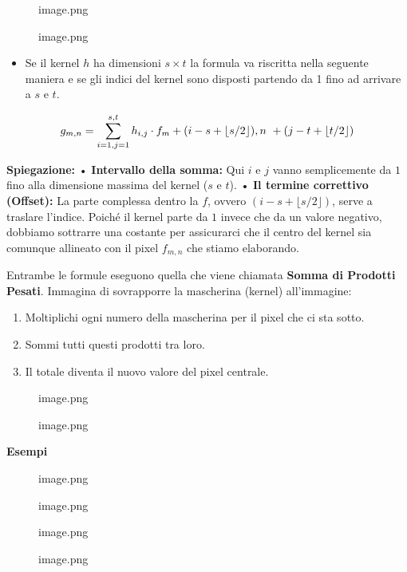 \documentclass[
]{article}
\providecommand{\tightlist}{%
  \setlength{\itemsep}{0pt}\setlength{\parskip}{0pt}}
\begin{document}
\begin{figure}
\centering
{image.png}
\caption{image.png}
\end{figure}

\begin{itemize}
\tightlist
\item
  Se il kernel \(h\) ha dimensioni \(s \times t\) la formula va riscritta nella seguente maniera e se gli indici del kernel sono disposti partendo da 1 fino ad arrivare a \(s\) e \(t\).
\end{itemize}

\[
g_{m,n} = \sum_{i=1, \space j=1}^{s, t}\space h_{i,j} \space \cdot \space f_m+(i-s+\left\lfloor s/2 \right\rfloor), n  + (j-t + \left\lfloor t/2 \right\rfloor)
\]

\textbf{Spiegazione:}
• \textbf{Intervallo della somma:} Qui \(i\) e \(j\) vanno semplicemente da \(1\) fino alla dimensione massima del kernel (\(s\) e \(t\)).
• \textbf{Il termine correttivo (Offset):} La parte complessa dentro la \(f\), ovvero \((i - s + \lfloor s/2 \rfloor)\), serve a traslare l'indice. Poiché il kernel parte da \(1\) invece che da un valore negativo, dobbiamo sottrarre una costante per assicurarci che il centro del kernel sia comunque allineato con il pixel \(f_{m,n}\) che stiamo elaborando.

Entrambe le formule eseguono quella che viene chiamata \textbf{Somma di Prodotti Pesati}. Immagina di sovrapporre la mascherina (kernel) all'immagine:

\begin{enumerate}
\def\labelenumi{\arabic{enumi}.}
\tightlist
\item
  Moltiplichi ogni numero della mascherina per il pixel che ci sta sotto.
\item
  Sommi tutti questi prodotti tra loro.
\item
  Il totale diventa il nuovo valore del pixel centrale.
\end{enumerate}

\begin{figure}
\centering
{image.png}
\caption{image.png}
\end{figure}

\textbf{Esempi}

\begin{figure}
\centering
{image.png}
\caption{image.png}
\end{figure}

\begin{figure}
\centering
{image.png}
\caption{image.png}
\end{figure}
\end{document}
